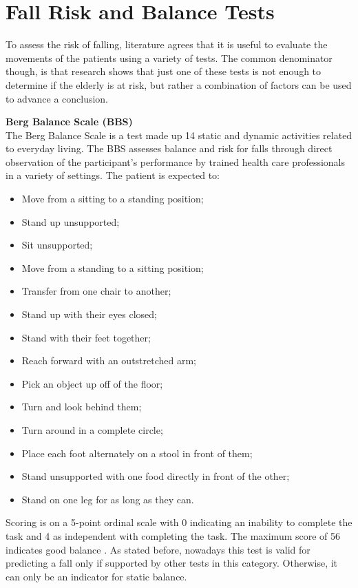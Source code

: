 \section{Fall Risk and Balance Tests}
To assess the risk of falling, literature agrees that it is useful to evaluate the movements of the patients using a variety of tests. The common denominator though, is that research shows that just one of these tests is not enough to determine if the elderly is at risk, but rather a combination of factors can be used to advance a conclusion.

\textbf{Berg Balance Scale (BBS)}
\\The Berg Balance Scale is a test made up 14 static and dynamic activities related to everyday living. The BBS assesses balance and risk for falls through direct observation of the participant's performance by trained health care professionals in a variety of settings. The patient is expected to:
\begin{itemize}
    \item Move from a sitting to a standing position;
    \item Stand up unsupported;
    \item Sit unsupported;
    \item Move from a standing to a sitting position;
    \item Transfer from one chair to another;
    \item Stand up with their eyes closed;
    \item Stand with their feet together;
    \item Reach forward with an outstretched arm;
    \item Pick an object up off of the floor;
    \item Turn and look behind them;
    \item Turn around in a complete circle;
    \item Place each foot alternately on a stool in front of them;
    \item Stand unsupported with one food directly in front of the other;
    \item Stand on one leg for as long as they can.
\end{itemize}
Scoring is on a 5-point ordinal scale with 0 indicating an inability to complete the task and 4 as independent with completing the task. The maximum score of 56 indicates good balance \cite{BergBalanceScale}. As stated before, nowadays this test is valid for predicting a fall only if supported by other tests in this category. Otherwise, it can only be an indicator for static balance.
